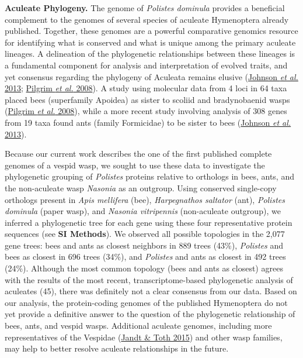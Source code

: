 \documentclass[]{article}
\begin{document}
\textbf{Aculeate Phylogeny.} The genome of \emph{Polistes dominula}
provides a beneficial complement to the genomes of several species of
aculeate Hymenoptera already published. Together, these genomes are a
powerful comparative genomics resource for identifying what is conserved
and what is unique among the primary aculeate lineages. A delineation of
the phylogenetic relationships between these lineages is a fundamental
component for analysis and interpretation of evolved traits, and yet
consensus regarding the phylogeny of Aculeata remains elusive
(\protect\hyperlink{ux5fENREFux5f22}{Johnson \emph{et al.} 2013};
\protect\hyperlink{ux5fENREFux5f44}{Pilgrim \emph{et al.} 2008}). A
study using molecular data from 4 loci in 64 taxa placed bees
(superfamily Apoidea) as sister to scoliid and bradynobaenid wasps
(\protect\hyperlink{ux5fENREFux5f44}{Pilgrim \emph{et al.} 2008}), while
a more recent study involving analysis of 308 genes from 19 taxa found
ants (family Formicidae) to be sister to bees
(\protect\hyperlink{ux5fENREFux5f22}{Johnson \emph{et al.} 2013}).

Because our current work describes the one of the first published
complete genomes of a vespid wasp, we sought to use these data to
investigate the phylogenetic grouping of \emph{Polistes} proteins
relative to orthologs in bees, ants, and the non-aculeate wasp
\emph{Nasonia} as an outgroup. Using conserved single-copy orthologs
present in \emph{Apis mellifera} (bee), \emph{Harpegnathos saltator}
(ant), \emph{Polistes dominula} (paper wasp), and \emph{Nasonia
vitripennis} (non-aculeate outgroup), we inferred a phylogenetic tree
for each gene using these four representative protein sequences (see
\textbf{SI Methods}). We observed all possible topologies in the 2,077
gene trees: bees and ants as closest neighbors in 889 trees (43\%),
\emph{Polistes} and bees as closest in 696 trees (34\%), and
\emph{Polistes} and ants as closest in 492 trees (24\%). Although the
most common topology (bees and ants as closest) agrees with the results
of the most recent, transcriptome-based phylogenetic analysis of
aculeates (45), there was definitely not a clear consensus from our
data. Based on our analysis, the protein-coding genomes of the published
Hymenoptera do not yet provide a definitive answer to the question of
the phylogenetic relationship of bees, ants, and vespid wasps.
Additional aculeate genomes, including more representatives of the
Vespidae (\protect\hyperlink{ux5fENREFux5f21}{Jandt \& Toth 2015}) and
other wasp families, may help to better resolve aculeate relationships
in the future.
\end{document}
